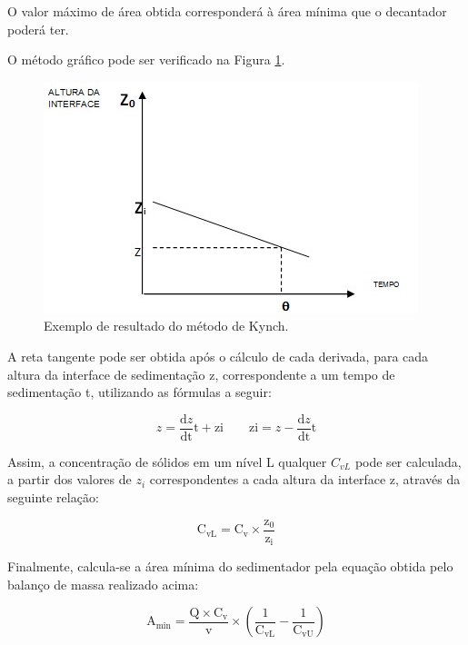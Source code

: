 O valor máximo de área obtida corresponderá à área mínima que o decantador poderá ter.

O método gráfico pode ser verificado na Figura \ref{met}.

\begin{figure}[H]
	\begin{center}
		\includegraphics[scale=.5,trim={0 0 0 0}]{figuras/ladeq/sedi/graphKynch}
		\caption{Exemplo de resultado do método de Kynch.}
		\label{met}
	\end{center}
\end{figure}


A reta tangente pode ser obtida após o cálculo de cada derivada, para cada altura da interface de sedimentação z, correspondente a um tempo de sedimentação t, utilizando as fórmulas a seguir:

\begin{equation}\label{key}
z=\frac{\mathrm{d} z}{\mathrm{dt}} \mathrm{t}+\mathrm{zi} \quad \quad \mathrm{zi}=z-\frac{\mathrm{d} z}{\mathrm{dt}} \mathrm{t}
\end{equation}

Assim, a concentração de sólidos em um nível L qualquer $ C_{vL} $ pode ser calculada, a partir dos valores de $ z_{i} $ correspondentes a cada altura da interface z, através da seguinte relação:

\begin{equation}\label{key}
\mathrm{C_{vL}}=\mathrm{C_{v}} \times \frac{\mathrm{z} _{0}}{\mathrm{z_{i}}}
\end{equation}

Finalmente, calcula-se a área mínima do sedimentador pela equação obtida pelo balanço de massa realizado acima:

\begin{equation}\label{key}
\operatorname{A_{min}}=\frac{\mathrm{Q} \times \mathrm{C_{v}}}{\mathrm{v}} \times\left(\frac{1}{\mathrm{C_{vL}}}-\frac{1}{\mathrm{C_{vU}}}\right)
\end{equation}

